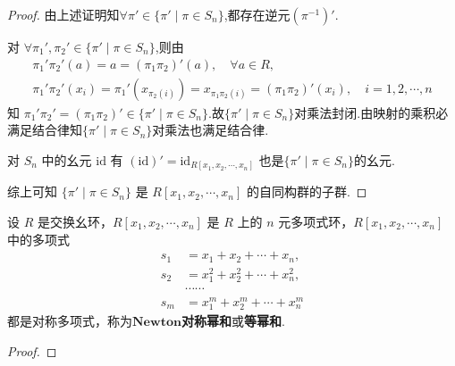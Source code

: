 \documentclass[../../main.tex]{subfiles}%
\begin{document}
\begin{proof}
由上述证明知$\forall \pi'\in \{\pi' \mid \pi \in S_n\}$,都存在逆元$(\pi^{-1})'$.

对 \(\forall \pi_1', \pi_2' \in \{\pi' \mid \pi \in S_n\} \),则由
\begin{gather*}
\pi_1'\pi_2'(a) = a=(\pi_1\pi_2)'(a), \quad \forall a \in R, \\
\pi_1'\pi_2'(x_i) = \pi_1'(x_{\pi_2(i)}) = x_{\pi_1\pi_2(i)}=(\pi_1\pi_2)'(x_i), \quad i = 1, 2, \cdots, n
\end{gather*}
知 \( \pi_1'\pi_2'=(\pi_1\pi_2)'\in \{\pi' \mid \pi \in S_n\} \).故$\{\pi' \mid \pi \in S_n\}$对乘法封闭.由映射的乘积必满足结合律知$\{\pi' \mid \pi \in S_n\}$对乘法也满足结合律.

对 \( S_n \) 中的幺元 \( \text{id} \) 有
$(\text{id})' = \text{id}_{R[x_1, x_2, \cdots, x_n]}$
也是$\{\pi' \mid \pi \in S_n\}$的幺元.

综上可知 \( \{\pi' \mid \pi \in S_n\} \) 是 \( R[x_1, x_2, \cdots, x_n] \) 的自同构群的子群.

\end{proof}

\begin{lemma}
设 \( R \) 是交换幺环，\( R[x_1, x_2, \cdots, x_n] \) 是 \( R \) 上的 \( n \) 元多项式环，\( R[x_1, x_2, \cdots, x_n] \) 中的多项式
\begin{align*}
s_1 &= x_1 + x_2 + \cdots + x_n, \\
s_2 &= x_1^2 + x_2^2 + \cdots + x_n^2, \\
&\cdots\cdots \\
s_m &= x_1^m + x_2^m + \cdots + x_n^m
\end{align*}
都是对称多项式，称为$\mathbf{Newton}$\textbf{对称幂和}或\textbf{等幂和}.
\end{lemma}
\begin{proof}



\end{proof}
\end{document}
